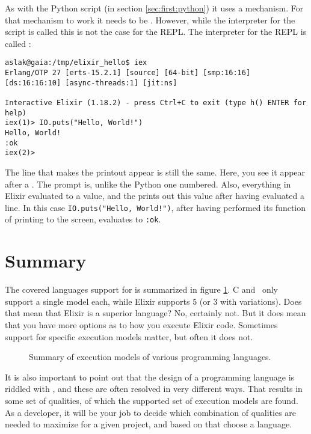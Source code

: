 
As with the Python script (in section \ref{sec:first:python}) it uses a  mechanism. For that mechanism to work it needs to be . However, while the interpreter for the script is called  this is not the case for the REPL. The interpreter for the REPL is called :

\begin{verbatim}
aslak@gaia:/tmp/elixir_hello$ iex
Erlang/OTP 27 [erts-15.2.1] [source] [64-bit] [smp:16:16] [ds:16:16:10] [async-threads:1] [jit:ns]

Interactive Elixir (1.18.2) - press Ctrl+C to exit (type h() ENTER for help)
iex(1)> IO.puts("Hello, World!")
Hello, World!
:ok
iex(2)> 
\end{verbatim}
The line that makes the printout appear is still the same. Here, you see it appear after a . The  prompt is, unlike the Python one numbered. Also, everything in Elixir evaluated to a value, and the  prints out this value after having evaluated a line. In this case \texttt{IO.puts("Hello, World!")}, after having performed its function of printing  to the screen, evaluates to \texttt{:ok}.





\section{Summary}

The covered languages support for  is summarized in figure \ref{fig:first:phases:summary}. C and \csharp\ only support a single model each, while Elixir supports 5 (or 3 with variations). Does that mean that Elixir is a superior language? No, certainly not. But it does mean that you have more options as to how you execute Elixir code. Sometimes support for specific execution models matter, but often it does not.

\begin{figure}[tbp]
  
  \caption{Summary of execution models of various programming languages.}
  \label{fig:first:phases:summary}
\end{figure}

It is also important to point out that the design of a programming language is riddled with , and these are often resolved in very different ways. That results in some set of qualities, of which the supported set of execution models are found. As a developer, it will be your job to decide which combination of qualities are needed to maximize  for a given project, and based on that choose a language.

